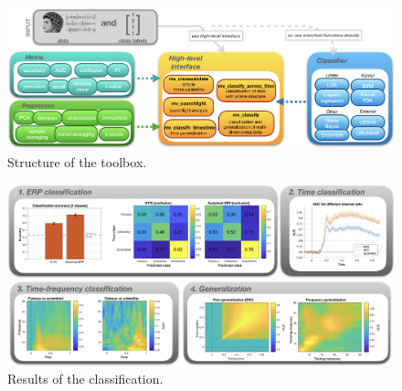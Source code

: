 \documentclass[utf8]{frontiersSCNS} %
\begin{document}

\begin{figure}[ht!]
\centering\includegraphics[width=\linewidth]{fig1_MVPA_structure}
\caption{Structure of the toolbox.}\label{fig:structure}
\end{figure}

\begin{figure}[ht!]
\centering\includegraphics[width=\linewidth]{MVPA_results}
\caption{Results of the classification.}\label{fig:results}
\end{figure}

\end{document}
